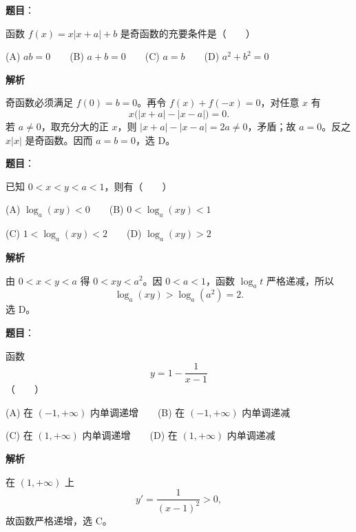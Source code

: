 \begin{answer}

\textbf{题目}：

函数 $f(x)=x|x+a|+b$ 是奇函数的充要条件是\mbox{（　　）}

(A) $ab=0$　　(B) $a+b=0$　　(C) $a=b$　　(D) $a^2+b^2=0$

\textbf{解析}

奇函数必须满足 $f(0)=b=0$。再令 $f(x)+f(-x)=0$，对任意 $x$ 有
\nopagebreak[4]
\[
x\bigl(|x+a|-|x-a|\bigr)=0.
\]
若 $a\ne0$，取充分大的正 $x$，则 $|x+a|-|x-a|=2a\ne0$，矛盾；故 $a=0$。反之 $x|x|$ 是奇函数。因而 $a=b=0$，选 D。


\end{answer}
\begin{answer}

\textbf{题目}：

已知 $0<x<y<a<1$，则有\mbox{（　　）}

(A) $\log_a(xy)<0$　　(B) $0<\log_a(xy)<1$

(C) $1<\log_a(xy)<2$　　(D) $\log_a(xy)>2$

\textbf{解析}

由 $0<x<y<a$ 得 $0<xy<a^2$。因 $0<a<1$，函数 $\log_a t$ 严格递减，所以
\nopagebreak[4]
\[
\log_a(xy)>\log_a(a^2)=2.
\]
选 D。


\end{answer}
\begin{answer}

\textbf{题目}：

函数
\nopagebreak[4]
\[
y=1-\frac{1}{x-1}
\]
\mbox{（　　）}

(A) 在 $(-1,+\infty)$ 内单调递增　　(B) 在 $(-1,+\infty)$ 内单调递减

(C) 在 $(1,+\infty)$ 内单调递增　　(D) 在 $(1,+\infty)$ 内单调递减

\textbf{解析}

在 $(1,+\infty)$ 上
\nopagebreak[4]
\[
y'=\frac1{(x-1)^2}>0,
\]
故函数严格递增，选 C。


\end{answer}

